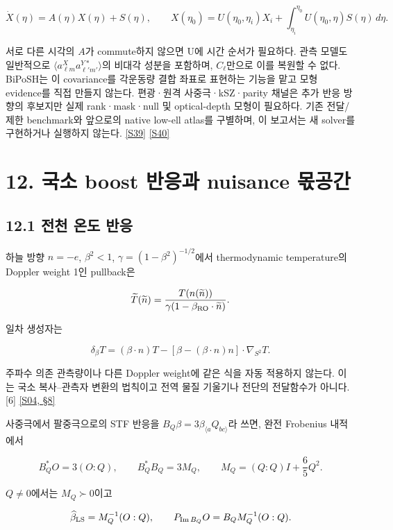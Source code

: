 \documentclass[11pt,a4paper]{article}
\begin{document}
\[
\dot X(\eta)=A(\eta)X(\eta)+S(\eta),\qquad
X(\eta_0)=U(\eta_0,\eta_i)X_i+
\int_{\eta_i}^{\eta_0}U(\eta_0,\eta)S(\eta)\,d\eta.
\]

서로 다른 시각의 \(A\)가 commute하지 않으면 U에 시간 순서가 필요하다. 관측 모델도 일반적으로 \(\langle a^X_{\ell m}a^{Y*}_{\ell'm'}\rangle\)의 비대각 성분을 포함하며, \(C_\ell\)만으로 이를 복원할 수 없다. BiPoSH는 이 covariance를 각운동량 결합 좌표로 표현하는 기능을 맡고 모형 evidence를 직접 만들지 않는다. 편광·원격 사중극·kSZ·parity 채널은 추가 반응 방향의 후보지만 실제 rank·mask·null 및 optical-depth 모형이 필요하다. 기존 전달/제한 benchmark와 앞으로의 native low-ell atlas를 구별하며, 이 보고서는 새 solver를 구현하거나 실행하지 않는다. \hyperlink{src:S39}{[S39]} \hyperlink{src:S40}{[S40]}


\hypertarget{s12}{}

\section*{12. 국소 boost 반응과 nuisance 몫공간}


\subsection*{12.1 전천 온도 반응}

하늘 방향 \(n=-e\), \(\beta^2<1\), \(\gamma=(1-\beta^2)^{-1/2}\)에서 thermodynamic temperature의 Doppler weight 1인 pullback은


\[
\widetilde T(\widetilde n)=
\frac{T(n(\widetilde n))}{\gamma(1-\beta_{\rm RO}\cdot\widetilde n)}.
\]

일차 생성자는


\[
\delta_\beta T=(\beta\cdot n)T-
[\beta-(\beta\cdot n)n]\cdot\nabla_{S^2}T.
\]

주파수 의존 관측량이나 다른 Doppler weight에 같은 식을 자동 적용하지 않는다. 이는 국소 복사–관측자 변환의 법칙이고 전역 물질 기울기나 전단의 전달함수가 아니다. [6] \hyperlink{src:S04}{[S04, §8]}


사중극에서 팔중극으로의 STF 반응을 \(B_Q\beta=3\beta_{\langle a}Q_{bc\rangle}\)라 쓰면, 완전 Frobenius 내적에서


\[
B_Q^*O=3(O:Q),\qquad B_Q^*B_Q=3M_Q,
\qquad M_Q=(Q:Q)I+\frac65Q^2.
\]

\(Q\ne0\)에서는 \(M_Q\succ0\)이고


\[
\widehat\beta_{\rm LS}=M_Q^{-1}(O:Q),\qquad
P_{\operatorname{Im}B_Q}O=B_QM_Q^{-1}(O:Q).
\]
\end{document}
